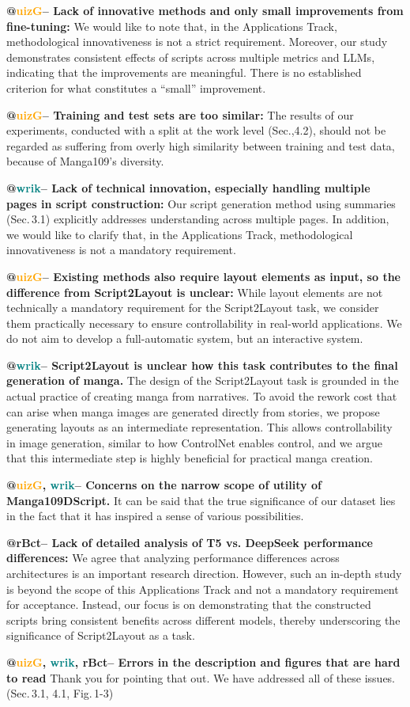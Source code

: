 \documentclass[10pt,twocolumn,letterpaper]{article}
\newcommand{\rBct}{\textcolor{wacvblue}{rBct}}
\newcommand{\uizG}{\textcolor{orange}{uizG}}
\newcommand{\wrik}{\textcolor{teal}{wrik}}
\begin{document}
\noindent\textbf{@\uizG – Lack of innovative methods and only small improvements from fine-tuning:}  
We would like to note that, in the Applications Track, methodological innovativeness is not a strict requirement. Moreover, our study demonstrates consistent effects of scripts across multiple metrics and LLMs, indicating that the improvements are meaningful. There is no established criterion for what constitutes a “small” improvement.

\noindent\textbf{@\uizG – Training and test sets are too similar:}  
The results of our experiments, conducted with a split at the work level (Sec.,4.2), should not be regarded as suffering from overly high similarity between training and test data, because of Manga109's diversity.

\noindent\textbf{@\wrik – Lack of technical innovation, especially handling multiple pages in script construction:}  
Our script generation method using summaries (Sec.\,3.1) explicitly addresses understanding across multiple pages. In addition, we would like to clarify that, in the Applications Track, methodological innovativeness is not a mandatory requirement.

\noindent\textbf{@\uizG – Existing methods also require layout elements as input, so the difference from Script2Layout is unclear:}
While layout elements are not technically a mandatory requirement for the Script2Layout task, we consider them practically necessary to ensure controllability in real-world applications. We do not aim to develop a full-automatic system, but an interactive system.


\noindent\textbf{@\wrik – Script2Layout is unclear how this task contributes to the final generation of manga.}
The design of the Script2Layout task is grounded in the actual practice of creating manga from narratives. To avoid the rework cost that can arise when manga images are generated directly from stories, we propose generating layouts as an intermediate representation. This allows controllability in image generation, similar to how ControlNet enables control, and we argue that this intermediate step is highly beneficial for practical manga creation.

\noindent\textbf{@\uizG, \wrik – Concerns on the narrow scope of utility of Manga109DScript.}
It can be said that the true significance of our dataset lies in the fact that it has inspired a sense of various possibilities.

\noindent\textbf{@\rBct – Lack of detailed analysis of T5 vs. DeepSeek performance differences:}  
We agree that analyzing performance differences across architectures is an important research direction. However, such an in-depth study is beyond the scope of this Applications Track and not a mandatory requirement for acceptance. Instead, our focus is on demonstrating that the constructed scripts bring consistent benefits across different models, thereby underscoring the significance of Script2Layout as a task.

\noindent\textbf{@\uizG, \wrik, \rBct – Errors in the description and figures that are hard to read}
Thank you for pointing that out. We have addressed all of these issues. (Sec.\,3.1, 4.1, Fig.\,1-3)
\end{document}
